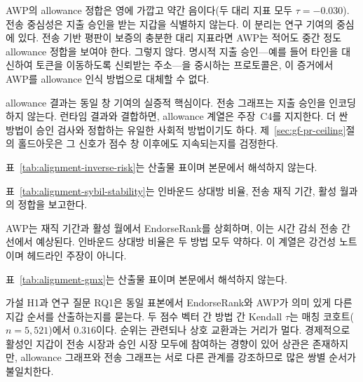 AWP의 allowance 정합은 영에 가깝고 약간 음이다(두 대리 지표 모두 $\tau=-0.030$). 전송 중심성은 지출 승인을 받는 지갑을 식별하지 않는다. 이 분리는 연구 기여의 중심에 있다. 전송 기반 평판이 보증의 충분한 대리 지표라면 AWP는 적어도 중간 정도 allowance 정합을 보여야 한다. 그렇지 않다. 명시적 지출 승인---예를 들어 타인을 대신하여 토큰을 이동하도록 신뢰받는 주소---을 중시하는 프로토콜은, 이 증거에서 AWP를 allowance 인식 방법으로 대체할 수 없다.

allowance 결과는 동일 창 기여의 실증적 핵심이다. 전송 그래프는 지출 승인을 인코딩하지 않는다. 런타임 결과와 결합하면, allowance 계열은 주장~C4를 지지한다. 더 싼 방법이 승인 검사와 정합하는 유일한 사회적 방법이기도 하다. 제~\ref{sec:gf-pr-ceiling}절의 홀드아웃은 그 신호가 점수 창 이후에도 지속되는지를 검정한다.


표~\ref{tab:alignment-inverse-risk}는 산출물 표이며 본문에서 해석하지 않는다.




표~\ref{tab:alignment-sybil-stability}는 인바운드 상대방 비율, 전송 재직 기간, 활성 월과의 정합을 보고한다.



AWP는 재직 기간과 활성 월에서 EndorseRank를 상회하며, 이는 시간 감쇠 전송 간선에서 예상된다. 인바운드 상대방 비율은 두 방법 모두 약하다. 이 계열은 강건성 노트이며 헤드라인 주장이 아니다.


표~\ref{tab:alignment-gmx}는 산출물 표이며 본문에서 해석하지 않는다.




가설 H1과 연구 질문 RQ1은 동일 표본에서 EndorseRank와 AWP가 의미 있게 다른 지갑 순서를 산출하는지를 묻는다. 두 점수 벡터 간 방법 간 Kendall $\tau$는 매칭 코호트($n=5{,}521$)에서 $0.316$이다. 순위는 관련되나 상호 교환과는 거리가 멀다. 경제적으로 활성인 지갑이 전송 시장과 승인 시장 모두에 참여하는 경향이 있어 상관은 존재하지만, allowance 그래프와 전송 그래프는 서로 다른 관계를 강조하므로 많은 쌍별 순서가 불일치한다.

